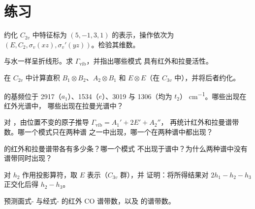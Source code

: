 \section{练习}

\begin{exercise}[$\star$]\label{exo:b3:group-theory-applied:1}
约化 $C_{2v}$ 中特征标为 $(5, -1, 3, 1)$ 的表示，操作依次为 $(E, C_2,
\sigma_v(xz), \sigma_v'(yz))$。检验其维数。
\end{exercise}

\begin{exercise}[$\star$]\label{exo:b3:group-theory-applied:2}
 与水一样呈折线形。求 $\Gamma_{\mathrm{vib}}$，并指出哪些模式
具有红外和拉曼活性。
\end{exercise}

\begin{exercise}[$\star$]\label{exo:b3:group-theory-applied:3}
在 $C_{2v}$ 中计算直积 $B_1\otimes B_2$、$A_2\otimes B_1$ 和
$E\otimes E$（在 $C_{3v}$ 中），并将后者约化。
\end{exercise}

\begin{exercise}[$\star$]\label{exo:b3:group-theory-applied:4}
 的基频位于 2917（$a_1$）、1534（$e$）、3019 与 1306（均为 $t_2$）
\unit{cm^{-1}}。哪些出现在红外光谱中，
哪些出现在拉曼光谱中？
\end{exercise}

\begin{exercise}[$\star\star$]\label{exo:b3:group-theory-applied:5}
对 ，由位置不变的原子推导 $\Gamma_{\mathrm{vib}} = A_1' + 2E' + A_2''$，
再统计红外和拉曼谱带数。哪一个模式只在两种谱
之一中出现，哪一个在两种谱中都出现？
\end{exercise}

\begin{exercise}[$\star\star$]\label{exo:b3:group-theory-applied:6}
 的红外和拉曼谱带各有多少条？哪一个模式
不出现于谱中？为什么两种谱中没有谱带同时出现？
\end{exercise}

\begin{exercise}[$\star\star$]\label{exo:b3:group-theory-applied:7}
对 $h_2$ 作用投影算符，取 $E$ 表示（$C_{3v}$ 群），并
证明：将所得结果对 $2h_1 - h_2 - h_3$ 正交化后得 $h_2 - h_3$。
\end{exercise}

\begin{exercise}[$\star\star$]\label{exo:b3:group-theory-applied:8}
预测面式- 与经式- 的红外 CO 谱带数，以及
 的谱带数。
\end{exercise}

